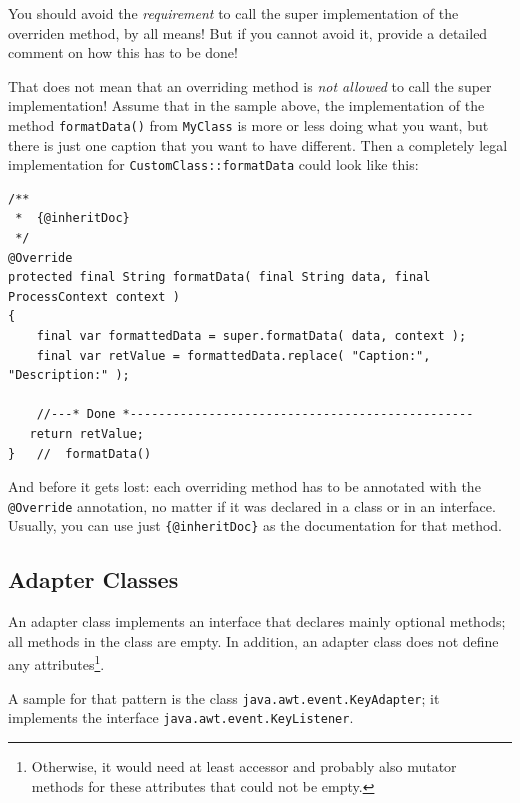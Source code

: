 \documentclass[11pt,a4paper, titlepage, parskip=half, headsepline, footsepline, cleardoublepage=current, headheight=1cm]{scrbook}
\begin{document}
You should avoid the \textit{requirement} to call the super implementation of the overriden method, by all means! But if you cannot avoid it, provide a detailed comment on how this has to be done!

That does not mean that an overriding method is \textit{not allowed} to call the super implementation! Assume that in the sample above, the implementation of the method \lstinline|formatData()| from \lstinline|MyClass| is more or less doing what you want, but there is just one caption that you want to have different. Then a completely legal implementation for \lstinline|CustomClass::formatData| could look like this:
\begin{lstlisting}
/**
 *  {@inheritDoc}
 */
@Override
protected final String formatData( final String data, final ProcessContext context )
{
	final var formattedData = super.formatData( data, context );
    final var retValue = formattedData.replace( "Caption:", "Description:" );
       
    //---* Done *------------------------------------------------
   return retValue;
}   //  formatData()
\end{lstlisting}

And before it gets lost: each overriding method has to be annotated with the \lstinline|@Override| annotation\autocite{ORACLE_DOC_OVERRIDE_ANNOTATION}, no matter if it was declared in a class or in an interface. Usually, you can use just \verb#{@inheritDoc}# as the documentation for that method.


\subsection{Adapter Classes}\label{sec:Adapter}
An adapter class implements an interface that declares mainly optional methods; all methods in the class are empty. In addition, an adapter class does not define any attributes\footnote{Otherwise, it would need at least accessor and probably also mutator methods for these attributes that could not be empty.}.

A sample for that pattern is the class \lstinline|java.awt.event.KeyAdapter|\autocite{ORACLE_DOC_KEYADAPTER_CLASS}; it implements the interface \lstinline|java.awt.event.KeyListener|\autocite{ORACLE_DOC_KEYADAPTER_INTERFACE}.
\end{document}

